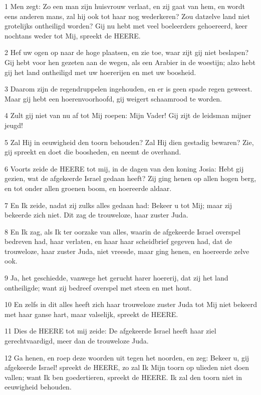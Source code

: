 \par 1 Men zegt: Zo een man zijn huisvrouw verlaat, en zij gaat van hem, en wordt eens anderen mans, zal hij ook tot haar nog wederkeren? Zou datzelve land niet grotelijks ontheiligd worden? Gij nu hebt met veel boeleerders gehoereerd, keer nochtans weder tot Mij, spreekt de HEERE.
\par 2 Hef uw ogen op naar de hoge plaatsen, en zie toe, waar zijt gij niet beslapen? Gij hebt voor hen gezeten aan de wegen, als een Arabier in de woestijn; alzo hebt gij het land ontheiligd met uw hoererijen en met uw boosheid.
\par 3 Daarom zijn de regendruppelen ingehouden, en er is geen spade regen geweest. Maar gij hebt een hoerenvoorhoofd, gij weigert schaamrood te worden.
\par 4 Zult gij niet van nu af tot Mij roepen: Mijn Vader! Gij zijt de leidsman mijner jeugd!
\par 5 Zal Hij in eeuwigheid den toorn behouden? Zal Hij dien gestadig bewaren? Zie, gij spreekt en doet die boosheden, en neemt de overhand.
\par 6 Voorts zeide de HEERE tot mij, in de dagen van den koning Josia: Hebt gij gezien, wat de afgekeerde Israel gedaan heeft? Zij ging henen op allen hogen berg, en tot onder allen groenen boom, en hoereerde aldaar.
\par 7 En Ik zeide, nadat zij zulks alles gedaan had: Bekeer u tot Mij; maar zij bekeerde zich niet. Dit zag de trouweloze, haar zuster Juda.
\par 8 En Ik zag, als Ik ter oorzake van alles, waarin de afgekeerde Israel overspel bedreven had, haar verlaten, en haar haar scheidbrief gegeven had, dat de trouweloze, haar zuster Juda, niet vreesde, maar ging henen, en hoereerde zelve ook.
\par 9 Ja, het geschiedde, vanwege het gerucht harer hoererij, dat zij het land ontheiligde; want zij bedreef overspel met steen en met hout.
\par 10 En zelfs in dit alles heeft zich haar trouweloze zuster Juda tot Mij niet bekeerd met haar ganse hart, maar valselijk, spreekt de HEERE.
\par 11 Dies de HEERE tot mij zeide: De afgekeerde Israel heeft haar ziel gerechtvaardigd, meer dan de trouweloze Juda.
\par 12 Ga henen, en roep deze woorden uit tegen het noorden, en zeg: Bekeer u, gij afgekeerde Israel! spreekt de HEERE, zo zal Ik Mijn toorn op ulieden niet doen vallen; want Ik ben goedertieren, spreekt de HEERE. Ik zal den toorn niet in eeuwigheid behouden.
